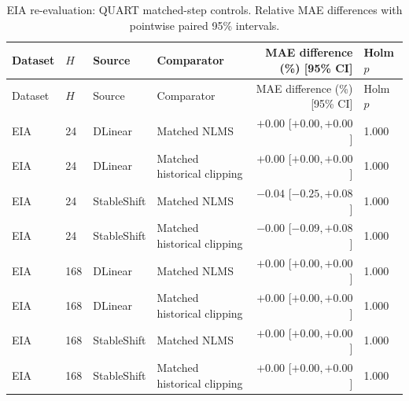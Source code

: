 \begin{longtable}{lllp{}rp{}}
\caption{EIA re-evaluation: QUART matched-step controls. Relative MAE differences with pointwise paired 95\% intervals.}\label{tab:independent_matched_mechanism}\\
\toprule
Dataset & $H$ & Source & Comparator & MAE difference (\%) [95\% CI] & Holm $p$\\
\midrule
\endfirsthead
\toprule
Dataset & $H$ & Source & Comparator & MAE difference (\%) [95\% CI] & Holm $p$\\
\midrule
\endhead
EIA & 24 & DLinear & Matched NLMS & $+0.00$ [$ +0.00, +0.00 $] & 1.000\\
EIA & 24 & DLinear & Matched historical clipping & $+0.00$ [$ +0.00, +0.00 $] & 1.000\\
EIA & 24 & StableShift & Matched NLMS & $-0.04$ [$ -0.25, +0.08 $] & 1.000\\
EIA & 24 & StableShift & Matched historical clipping & $-0.00$ [$ -0.09, +0.08 $] & 1.000\\
EIA & 168 & DLinear & Matched NLMS & $+0.00$ [$ +0.00, +0.00 $] & 1.000\\
EIA & 168 & DLinear & Matched historical clipping & $+0.00$ [$ +0.00, +0.00 $] & 1.000\\
EIA & 168 & StableShift & Matched NLMS & $+0.00$ [$ +0.00, +0.00 $] & 1.000\\
EIA & 168 & StableShift & Matched historical clipping & $+0.00$ [$ +0.00, +0.00 $] & 1.000\\
\bottomrule
\end{longtable}

